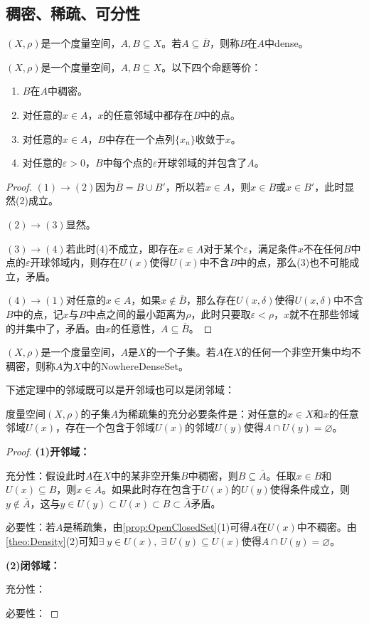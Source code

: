 \subsection{稠密、稀疏、可分性}
\begin{definition}
	$(X,\rho)$是一个度量空间，$A,B\subseteq X$。若$A\subseteq\overline{B}$，则称$B$在$A$中\gls{dense}。
\end{definition}
\begin{theorem}\label{theo:Density}
	$(X,\rho)$是一个度量空间，$A,B\subseteq X$。以下四个命题等价：
	\begin{enumerate}
		\item $B$在$A$中稠密。
		\item 对任意的$ x\in A$，$x$的任意邻域中都存在$B$中的点。
		\item 对任意的$ x\in A$，$B$中存在一个点列$\{x_n\}$收敛于$x$。
		\item 对任意的$\varepsilon>0$，$B$中每个点的$\varepsilon$开球邻域的并包含了$A$。
	\end{enumerate}
\end{theorem}
\begin{proof}
	$(1)\to(2)$因为$\overline{B}=B\cup B'$，所以若$x\in A$，则$x\in B$或$x\in B'$，此时显然(2)成立。\par
	$(2)\to(3)$显然。\par
	$(3)\to(4)$若此时(4)不成立，即存在$x\in A$对于某个$\varepsilon$，满足条件$x$不在任何$B$中点的$\varepsilon$开球邻域内，则存在$U(x)$使得$U(x)$中不含$B$中的点，那么(3)也不可能成立，矛盾。\par
	$(4)\to(1)$对任意的$ x\in A$，如果$x\notin \overline{B}$，那么存在$U(x,\delta)$使得$U(x,\delta)$中不含$B$中的点，记$x$与$B$中点之间的最小距离为$\rho$，此时只要取$\varepsilon<\rho$，$x$就不在那些邻域的并集中了，矛盾。由$x$的任意性，$A\subseteq\overline{B}$。
\end{proof}
\begin{definition}
	$(X,\rho)$是一个度量空间，$A$是$X$的一个子集。若$A$在$X$的任何一个非空开集中均不稠密，则称$A$为$X$中的\gls{NowhereDenseSet}。
\end{definition}
下述定理中的邻域既可以是开邻域也可以是闭邻域：
\begin{theorem}
	度量空间$(X,\rho)$的子集$A$为稀疏集的充分必要条件是：对任意的$x\in X$和$x$的任意邻域$U(x)$，存在一个包含于邻域$U(x)$的邻域$U(y)$使得$A\cap U(y)=\varnothing$。
\end{theorem}
\begin{proof}
	\textbf{(1)开邻域：}\par
	充分性：假设此时$A$在$X$中的某非空开集$B$中稠密，则$B\subseteq\overline{A}$。任取$x\in B$和$U(x)\subseteq B$，则$x\in\overline{A}$。如果此时存在包含于$U(x)$的$U(y)$使得条件成立，则$y\notin\overline{A}$，这与$y\in U(y)\subset U(x)\subset B\subset\overline{A}$矛盾。\par
	必要性：若$A$是稀疏集，由\cref{prop:OpenClosedSet}(1)可得$A$在$U(x)$中不稠密。由\cref{theo:Density}(2)可知$\exists\;y\in U(x),\;\exists\;U(y)\subseteq U(x)$使得$A\cap U(y)=\varnothing$。\par
	\textbf{(2)闭邻域：}\par
	充分性：\par
	必要性：
\end{proof}
